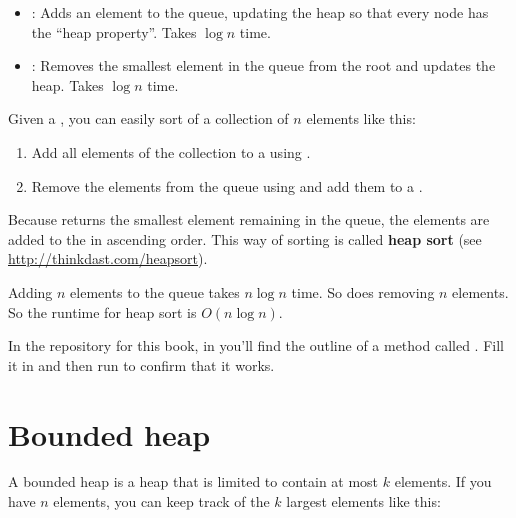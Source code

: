 \documentclass[12pt]{book}
\theoremstyle{exercise}
\begin{document}
\begin{itemize}

\item
  : Adds an element to the queue, updating the heap so
  that every node has the ``heap property''. Takes $\log n$ time.

\item
  : Removes the smallest element in the queue from the root
  and updates the heap. Takes $\log n$ time.

\end{itemize}

Given a , you can easily sort of a collection of
$n$ elements like this:

\begin{enumerate}

\item
  Add all elements of the collection to a  using
  .

\item
  Remove the elements from the queue using  and add them to
  a .

\end{enumerate}

Because  returns the smallest element remaining in the
queue, the elements are added to the  in ascending order.
This way of sorting is called {\bf heap sort}
(see \url{http://thinkdast.com/heapsort}).


Adding $n$ elements to the queue takes $n \log n$ time. So
does removing $n$ elements. So the runtime for heap sort is
$O(n \log n)$.


In the repository for this book, in  you'll find
the outline of a method called . Fill it in and then
run  to confirm that it works.


\section{Bounded heap}
\label{bounded-heap}


A bounded heap is a heap that is limited to contain at most $k$
elements. If you have $n$ elements, you can keep track of the
$k$ largest elements like this:
\end{document}
